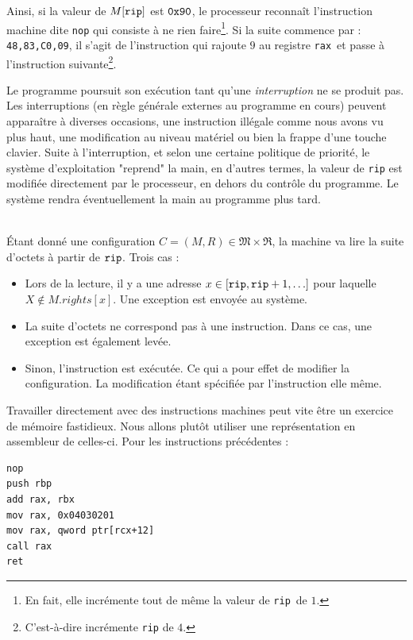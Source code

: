 \documentclass{book}
\newenvironment{formalisme}[1]{%
	\def\FrameCommand{\fboxrule=\FrameRule\fboxsep=\FrameSep \fcolorbox{red!10}{red!5}}%
	\MakeFramed {\advance\hsize-\width \FrameRestore}
	\noindent {\bf #1}\\
}%
{\endMakeFramed}
\newcommand{\code}[1]{\texttt{#1}}
\newcommand{\rip}{{\tt rip}\xspace}
\newcommand{\rax}{{\tt rax}\xspace}
\newcommand{\hexa}[1]{{\tt 0x#1}}
\newcommand{\vReg}{{\mathfrak{R}}}
\newcommand{\Memory}{{\mathfrak{M}}}
\begin{document}
Ainsi, si la valeur de  $M[\rip]$ est $\hexa{90}$, le processeur reconnaît l'instruction machine dite \code{nop} qui consiste à ne rien faire\footnote{En fait, elle incrémente tout de même la valeur de \rip\ de $1$. }. Si la suite commence par : \code{48,83,C0,09},  il s'agit de l'instruction qui rajoute $9$ au registre \rax\ et passe à l'instruction suivante\footnote{C'est-à-dire incrémente \rip de $4$.}.  

Le programme  poursuit son exécution tant qu'une \emph{interruption} ne se produit pas. Les interruptions (en règle générale externes au programme en cours) peuvent apparaître à diverses occasions, une instruction illégale comme nous avons vu plus haut, une modification au niveau matériel ou bien la frappe d'une touche clavier. Suite à l'interruption, et selon une certaine politique de priorité, le système d'exploitation "reprend" la main, en d'autres termes, la valeur de \rip est modifiée directement par le processeur, en dehors du contrôle du programme. Le système rendra éventuellement la main au programme plus tard. 

\begin{formalisme}{Exécution}
\'Etant donné une configuration $C = (M, R) \in \Memory \times \vReg$, la machine va lire la suite d'octets à partir de $\rip$. Trois cas : 
\begin{itemize}
	\item Lors de la lecture, il y a une adresse $x \in [\rip, \rip+1, \ldots]$ pour laquelle $X \not\in M.rights[x]$. Une exception est envoyée au système. 
	\item La suite d'octets ne correspond pas à une instruction. Dans ce cas, une exception est également levée. 
	\item Sinon, l'instruction est exécutée. Ce qui a pour effet de modifier la configuration. La modification étant spécifiée par l'instruction elle même.
\end{itemize}
\end{formalisme}

Travailler directement avec des instructions machines peut vite être un exercice de mémoire fastidieux. Nous allons plutôt utiliser une représentation en assembleur de celles-ci. Pour les instructions précédentes : 
\begin{verbatim}
nop
push rbp
add rax, rbx
mov rax, 0x04030201
mov rax, qword ptr[rcx+12]
call rax
ret
\end{verbatim}
\end{document}
